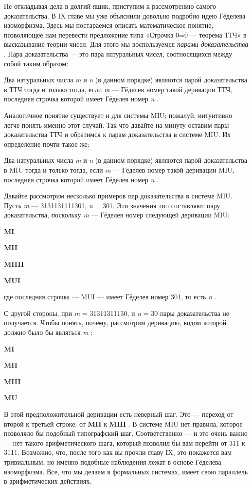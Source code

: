 \documentclass[../main.tex]{subfiles}
\begin{document}
Не откладывая дела в долгий ящик, приступим к рассмотрению самого доказательства. В IX главе мы уже объяснили довольно подробно идею Гёделева изоморфизма. Здесь мы постараемся описать математическое понятие, позволяющее нам перевести предложение типа «Строчка 0=0 --- теорема ТТЧ» в высказывание теории чисел. Для этого мы воспользуемся \emph{парами доказательства} . Пара доказательства --- это пара натуральных чисел, соотносящихся между собой таким образом:

Два натуральных числа \emph{m} и \emph{n} (в данном порядке) являются парой доказательства в ТТЧ тогда и только тогда, если \emph{m} --- Гёделев номер такой деривации ТТЧ, последняя строчка которой имеет Гёделев номер \emph{n} .

Аналогичное понятие существует и для системы MIU; пожалуй, интуитивно легче понять именно этот случай. Так что давайте на минуту оставим пары доказательства ТТЧ и обратимся к парам доказательства в системе MIU. Их определение почти такое же:

Два натуральных числа \emph{m} и \emph{n} (в данном порядке) являются парой доказательства в MIU тогда и только тогда, если \emph{m} --- Гёделев номер такой деривации MIU, последняя строчка которой имеет Гёделев номер \emph{n} .

Давайте рассмотрим несколько примеров пар доказательства в системе MIU. Пусть \emph{m} --- 3131131111301, \emph{n} = 301. Эти значения тип составляют пару доказательства, поскольку \emph{m} --- Гёделев номер следующей деривации MIU:

\textbf{MI}

\textbf{MII}

\textbf{MIIII}

\textbf{MUI}

где последняя строчка --- MUI --- имеет Гёделев номер 301, то есть \emph{n} .

С другой стороны, при \emph{m} = 31311311130, и \emph{n} = 30 пары доказательства не получается. Чтобы понять, почему, рассмотрим деривацию, кодом которой должно было бы являться \emph{m} :

\textbf{MI}

\textbf{MII}

\textbf{MIII}

\textbf{MU}

В этой предположительной деривации есть неверный шаг. Это --- переход от второй к третьей строке: от \textbf{MII} к \textbf{MIII} . В системе MIU нет правила, которое позволяло бы подобный типографский шаг. Соответственно --- и это очень важно --- нет такого арифметического шага, который позволил бы вам перейти от 311 к 3111. Возможно, что, после того как вы прочли главу IX, это покажется вам тривиальным, но именно подобные наблюдения лежат в основе Гёделева изоморфизма. Все, что мы делаем в формальных системах, имеет свою параллель в арифметических действиях.
\end{document}
